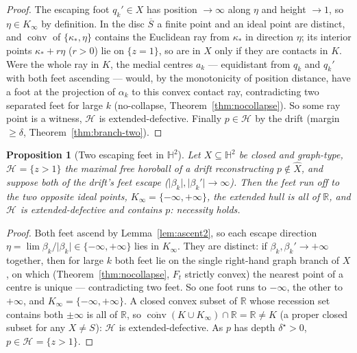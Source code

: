 \documentclass[11pt]{article}
\newtheorem{proposition}[theorem]{Proposition}
\theoremstyle{remark}
\newcommand{\R}{\mathbb{R}}
\newcommand{\X}{X}
\newcommand{\Xhat}{\widehat{\X}}
\newcommand{\Hb}[1]{\mathcal{H}_{#1}}
\newcommand{\Sb}[1]{S_{#1}}
\begin{document}
\begin{proof}
The escaping foot $q_{k}'\in\X$ has position $\to\infty$ along $\eta$
and height $\to1$, so $\eta\in K_{\infty}$ by definition. In the disc
$\overline{\Sb{}}$ a finite point and an ideal point are distinct, and
$\overline{\operatorname{conv}}$ of $\{\kappa_{\ast},\eta\}$ contains
the Euclidean ray from $\kappa_{\ast}$ in direction $\eta$; its
interior points $\kappa_{\ast}+r\eta$ ($r>0$) lie on $\{z=1\}$, so are
in $\X$ only if they are contacts in $K$. Were the whole ray in $K$,
the medial centres $a_{k}$ --- equidistant from $q_{k}$ and $q_{k}'$
with both feet ascending --- would, by the monotonicity of position
distance, have a foot at the projection of $\alpha_{k}$ to this convex
contact ray, contradicting two separated feet for large $k$ (no-collapse,
Theorem~\ref{thm:nocollapse}). So some ray point is a witness, $\Hb{}$
is extended-defective. Finally $p\in\Hb{}$ by the drift (margin
$\ge\delta$, Theorem~\ref{thm:branch-two}).
\end{proof}

\begin{proposition}[Two escaping feet in $\mathbb{H}^{2}$]
\label{prop:twoescape}
Let $\X\subseteq\mathbb{H}^{2}$ be closed and graph-type, $\Hb{}=
\{z>1\}$ the maximal free horoball of a drift reconstructing
$p\notin\Xhat$, and suppose both of the drift's feet escape
($\lvert\beta_{k}\rvert,\lvert\beta_{k}'\rvert\to\infty$). Then the
feet run off to the two opposite ideal points, $K_{\infty}=
\{-\infty,+\infty\}$, the extended hull is all of $\R$, and $\Hb{}$ is
extended-defective and contains $p$: necessity holds.
\end{proposition}

\begin{proof}
Both feet ascend by Lemma~\ref{lem:ascent2}, so each escape direction
$\eta=\lim\beta_{k}/\lvert\beta_{k}\rvert\in\{-\infty,+\infty\}$ lies
in $K_{\infty}$. They are
distinct: if $\beta_{k},\beta_{k}'\to+\infty$ together, then for large
$k$ both feet lie on the single right-hand graph branch of $\X$, on
which (Theorem~\ref{thm:nocollapse}, $F_{t}$ strictly convex) the
nearest point of a centre is unique --- contradicting two feet. So one
foot runs to $-\infty$, the other to $+\infty$, and $K_{\infty}=
\{-\infty,+\infty\}$. A closed convex subset of $\R$ whose recession
set contains both $\pm\infty$ is all of $\R$, so
$\overline{\operatorname{conv}}(K\cup K_{\infty})\cap\R=\R\neq K$ (a
proper closed subset for any $\X\neq\Sb{}$): $\Hb{}$ is
extended-defective. As $p$ has depth $\delta^{\star}>0$,
$p\in\Hb{}=\{z>1\}$.
\end{proof}
\end{document}
